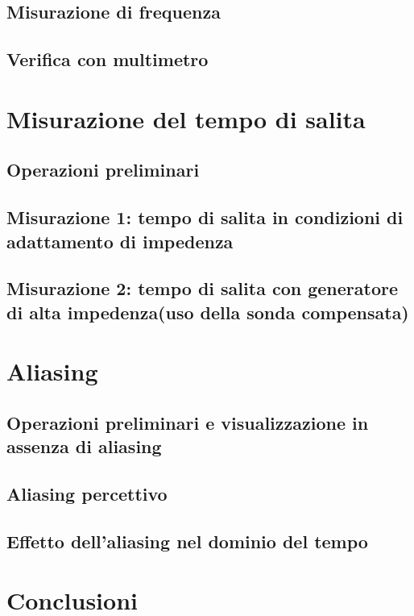 \documentclass{article}
\begin{document}
    


\subsection{Misurazione di frequenza}
\subsection{Verifica con multimetro}
    
\section{Misurazione del tempo di salita}
\subsection{Operazioni preliminari}
\subsection{Misurazione 1: tempo di salita in condizioni di adattamento di impedenza}
\subsection{Misurazione 2: tempo di salita con generatore di alta impedenza(uso della sonda compensata)}

\section{Aliasing}
\subsection{Operazioni preliminari e visualizzazione in assenza di aliasing}
\subsection{Aliasing percettivo}
\subsection{Effetto dell'aliasing nel dominio del tempo}
    
\section{Conclusioni}
    
    
    
\end{document}
